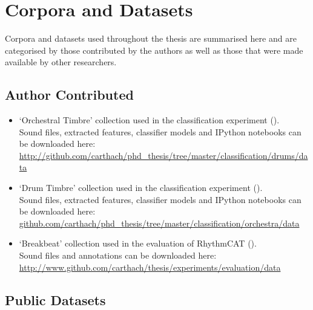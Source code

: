 \section*{Corpora and Datasets}

Corpora and datasets used throughout the thesis are summarised here and are categorised by those contributed by the authors as well as those that were made available by other researchers.

\subsection*{Author Contributed}
\begin{itemize}
	\item `Orchestral Timbre' collection used in the classification experiment (). \\ 
	Sound files, extracted features, classifier models and IPython notebooks can be downloaded here:\\
	\url{http://github.com/carthach/phd_thesis/tree/master/classification/drums/data}
	\item `Drum Timbre' collection used in the classification experiment (). \\ 
	Sound files, extracted features, classifier models and IPython notebooks can be downloaded here:\\
	\url{github.com/carthach/phd_thesis/tree/master/classification/orchestra/data}	
	\item `Breakbeat' collection used in the evaluation of RhythmCAT ().\\ 
	Sound files and annotations can be downloaded here:\\
	\url{http://www.github.com/carthach/thesis/experiments/evaluation/data}	
\end{itemize}

\subsection*{Public Datasets}

